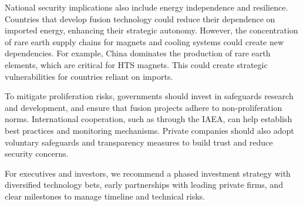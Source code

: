 \documentclass[10pt,a4paper]{article}
\begin{document}
{\small National security implications also include energy independence and resilience. Countries that develop fusion technology could reduce their dependence on imported energy, enhancing their strategic autonomy. However, the concentration of rare earth supply chains for magnets and cooling systems could create new dependencies. For example, China dominates the production of rare earth elements, which are critical for HTS magnets. This could create strategic vulnerabilities for countries reliant on imports.}\par
{\small To mitigate proliferation risks, governments should invest in safeguards research and development, and ensure that fusion projects adhere to non-proliferation norms. International cooperation, such as through the IAEA, can help establish best practices and monitoring mechanisms. Private companies should also adopt voluntary safeguards and transparency measures to build trust and reduce security concerns.}\par
{\small For executives and investors, we recommend a phased investment strategy with diversified technology bets, early partnerships with leading private firms, and clear milestones to manage timeline and technical risks.}\par
\label{chap:5:end}
\end{document}
